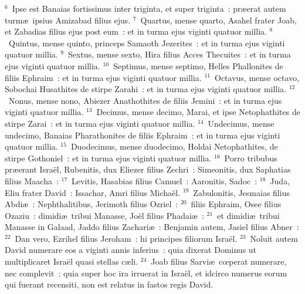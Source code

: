 ${}^{6}$~Ipse est Banaias fortissimus inter triginta, et super triginta~: pr\ae erat autem turm\ae\ ipsius Amizabad filius ejus.
${}^{7}$~Quartus, mense quarto, Asahel frater Joab, et Zabadias filius ejus post eum~: et in turma ejus viginti quatuor millia.
${}^{8}$~Quintus, mense quinto, princeps Samaoth Jezerites~: et in turma ejus viginti quatuor millia.
${}^{9}$~Sextus, mense sexto, Hira filius Acces Thecuites~: et in turma ejus viginti quatuor millia.
${}^{10}$~Septimus, mense septimo, Helles Phallonites de filiis Ephraim~: et in turma ejus viginti quatuor millia.
${}^{11}$~Octavus, mense octavo, Sobochai Husathites de stirpe Zarahi~: et in turma ejus viginti quatuor millia.
${}^{12}$~Nonus, mense nono, Abiezer Anathothites de filiis Jemini~: et in turma ejus viginti quatuor millia.
${}^{13}$~Decimus, mense decimo, Marai, et ipse Netophathites de stirpe Zarai~: et in turma ejus viginti quatuor millia.
${}^{14}$~Undecimus, mense undecimo, Banaias Pharathonites de filiis Ephraim~: et in turma ejus viginti quatuor millia.
${}^{15}$~Duodecimus, mense duodecimo, Holdai Netophathites, de stirpe Gothoniel~: et in turma ejus viginti quatuor millia.
${}^{16}$~Porro tribubus pr\ae erant Isra\"el, Rubenitis, dux Eliezer filius Zechri~: Simeonitis, dux Saphatias filius Maacha~:
${}^{17}$~Levitis, Hasabias filius Camuel~: Aaronitis, Sadoc~:
${}^{18}$~Juda, Eliu frater David~: Issachar, Amri filius Micha\"el.
${}^{19}$~Zabulonitis, Jesmaias filius Abdi\ae~: Nephthalitibus, Jerimoth filius Ozriel~:
${}^{20}$~filiis Ephraim, Osee filius Ozaziu~: dimidi\ae\ tribui Manasse, Jo\"el filius Phadai\ae~:
${}^{21}$~et dimidi\ae\ tribui Manasse in Galaad, Jaddo filius Zachari\ae~: Benjamin autem, Jasiel filius Abner~:
${}^{22}$~Dan vero, Ezrihel filius Jeroham~: hi principes filiorum Isra\"el.
${}^{23}$~Noluit autem David numerare eos a viginti annis inferius~: quia dixerat Dominus ut multiplicaret Isra\"el quasi stellas c\ae li.
${}^{24}$~Joab filius Sarvi\ae\ cœperat numerare, nec complevit~: quia super hoc ira irruerat in Isra\"el, et idcirco numerus eorum qui fuerant recensiti, non est relatus in fastos regis David.


